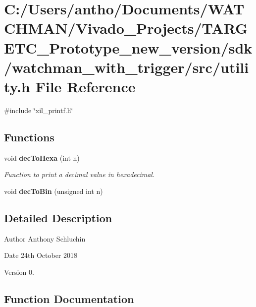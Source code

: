 \section{C\+:/\+Users/antho/\+Documents/\+W\+A\+T\+C\+H\+M\+A\+N/\+Vivado\+\_\+\+Projects/\+T\+A\+R\+G\+E\+T\+C\+\_\+\+Prototype\+\_\+new\+\_\+version/sdk/watchman\+\_\+with\+\_\+trigger/src/utility.h File Reference}
\label{utility_8h}
{\ttfamily \#include \char`\"{}xil\+\_\+printf.\+h\char`\"{}}\newline
\subsection*{Functions}
\begin{DoxyCompactItemize}
\item 
void \textbf{ dec\+To\+Hexa} (int n)
\begin{DoxyCompactList}\small\item\em Function to print a decimal value in hexadecimal. \end{DoxyCompactList}\item 
\mbox{\label{utility_8h_ab6bfd5f2ec61e61cf18720fc4996a2a5}} 
void {\bfseries dec\+To\+Bin} (unsigned int n)
\end{DoxyCompactItemize}


\subsection{Detailed Description}
\begin{DoxyAuthor}{Author}
Anthony Schluchin 
\end{DoxyAuthor}
\begin{DoxyDate}{Date}
24th October 2018 
\end{DoxyDate}
\begin{DoxyVersion}{Version}
0. 
\end{DoxyVersion}


\subsection{Function Documentation}
\mbox{\label{utility_8h_a5fb2cb4fed790bdbf631c7b081320eae}} 
